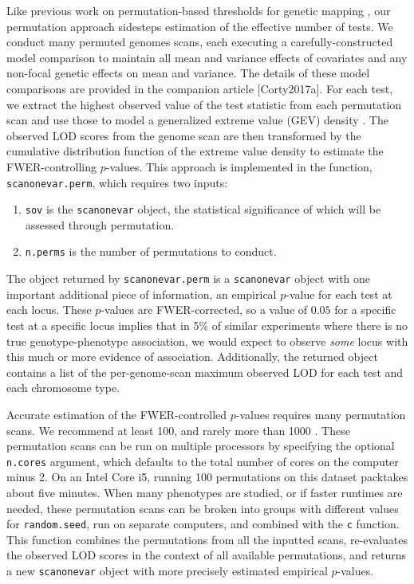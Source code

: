 \documentclass{article}
\begin{document}
Like previous work on permutation-based thresholds for genetic mapping \citep{Churchill1994,Carlborg2002}, our permutation approach sidesteps estimation of the effective number of tests.
We conduct many permuted genomes scans, each executing a carefully-constructed model comparison to maintain all mean and variance effects of covariates and any non-focal genetic effects on mean and variance.
The details of these model comparisons are provided in the companion article [Corty2017a].
For each test, we extract the highest observed value of the test statistic from each permutation scan and use those to model a generalized extreme value (GEV) density \citep{Stephenson2002}.
The observed LOD scores from the genome scan are then transformed by the cumulative distribution function of the extreme value density to estimate the FWER-controlling $p$-values.
This approach is implemented in the function, \texttt{scanonevar.perm}, which requires two inputs:

\begin{enumerate}
	\item \texttt{sov} is the \texttt{scanonevar} object, the statistical significance of which will be assessed through permutation.
	\item \texttt{n.perms} is the number of permutations to conduct.
\end{enumerate}

The object returned by \texttt{scanonevar.perm} is a \texttt{scanonevar} object with one important additional piece of information, an empirical $p$-value for each test at each locus.
These $p$-values are FWER-corrected, so a value of $0.05$ for a specific test at a specific locus implies that in 5\% of similar experiments where there is no true genotype-phenotype association, we would expect to observe \textit{some} locus with this much or more evidence of association.
Additionally, the returned object contains a list of the per-genome-scan maximum observed LOD for each test and each chromosome type.

Accurate estimation of the FWER-controlled $p$-values requires many permutation scans.
We recommend at least 100, and rarely more than 1000 \citep{Churchill1994,Carlborg2002}.
These permutation scans can be run on multiple processors by specifying the optional \texttt{n.cores} argument, which defaults to the total number of cores on the computer minus 2.
On an Intel Core i5, running 100 permutations on this dataset packtakes about five minutes.
When many phenotypes are studied, or if faster runtimes are needed, these permutation scans can be broken into groups with different values for \texttt{random.seed}, run on separate computers, and combined with the \texttt{c} function.
This function combines the permutations from all the inputted scans, re-evaluates the observed LOD scores in the context of all available permutations, and returns a new \texttt{scanonevar} object with more precisely estimated empirical $p$-values.
\end{document}
